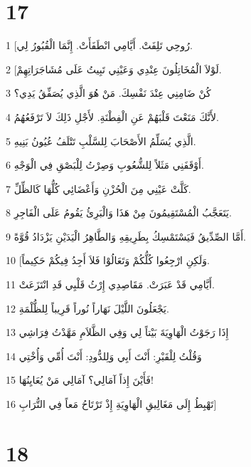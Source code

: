 \chapter{17}

\par 1 [رُوحِي تَلِفَتْ. أَيَّامِي انْطَفَأَتْ. إِنَّمَا الْقُبُورُ لِي.
\par 2 [لَوْلاَ الْمُخَاتِلُونَ عِنْدِي وَعَيْنِي تَبِيتُ عَلَى مُشَاجَرَاتِهِمْ.
\par 3 كُنْ ضَامِنِي عِنْدَ نَفْسِكَ. مَنْ هُوَ الَّذِي يُصَفِّقُ يَدِي؟
\par 4 لأَنَّكَ مَنَعْتَ قَلْبَهُمْ عَنِ الْفِطْنَةِ. لأَجْلِ ذَلِكَ لاَ تَرْفَعُهُمُ.
\par 5 الَّذِي يُسَلِّمُ الأَصْحَابَ لِلسَّلْبِ تَتْلَفُ عُيُونُ بَنِيهِ.
\par 6 أَوْقَفَنِي مَثَلاً لِلشُّعُوبِ وَصِرْتُ لِلْبَصْقِ فِي الْوَجْهِ.
\par 7 كَلَّتْ عَيْنِي مِنَ الْحُزْنِ وَأَعْضَائِي كُلُّهَا كَالظِّلِّ.
\par 8 يَتَعَجَّبُ الْمُسْتَقِيمُونَ مِنْ هَذَا وَالْبَرِئُ يَقُومُ عَلَى الْفَاجِرِ.
\par 9 أَمَّا الصِّدِّيقُ فَيَسْتَمْسِكُ بِطَرِيقِهِ وَالطَّاهِرُ الْيَدَيْنِ يَزْدَادُ قُوَّةً.
\par 10 [وَلَكِنِ ارْجِعُوا كُلُّكُمْ وَتَعَالُوْا فَلاَ أَجِدُ فِيكُمْ حَكِيماً.
\par 11 أَيَّامِي قَدْ عَبَرَتْ. مَقَاصِدِي إِرْثُ قَلْبِي قَدِ انْتَزَعَتْ.
\par 12 يَجْعَلُونَ اللَّيْلَ نَهَاراً نُوراً قَرِيباً لِلظُّلْمَةِ.
\par 13 إِذَا رَجَوْتُ الْهَاوِيَةَ بَيْتاً لِي وَفِي الظَّلاَمِ مَهَّدْتُ فِرَاشِي
\par 14 وَقُلْتُ لِلْقَبْرِ: أَنْتَ أَبِي وَلِلدُّودِ: أَنْتَ أُمِّي وَأُخْتِي
\par 15 فَأَيْنَ إِذاً آمَالِي؟ آمَالِي مَنْ يُعَايِنُهَا!
\par 16 تَهْبِطُ إِلَى مَغَالِيقِ الْهَاوِيَةِ إِذْ تَرْتَاحُ مَعاً فِي التُّرَابِ]

\chapter{18}

